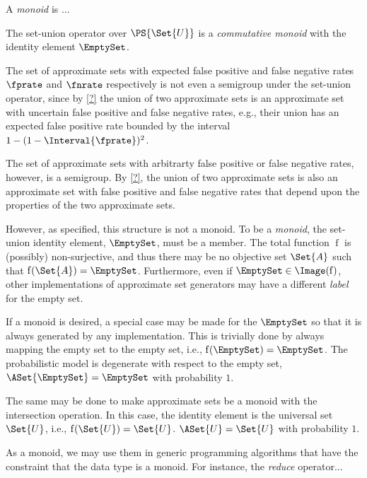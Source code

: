\documentclass[ ../main.tex]{subfiles}
\begin{document}
\begin{definition}
A \emph{monoid} is ...
\end{definition}

The set-union operator over $\PS{\Set{U}}$ is a \emph{commutative monoid} with the identity element $\EmptySet$.

The set of approximate sets with expected false positive and false negative rates $\fprate$ and $\fnrate$ respectively is not even a semigroup under the set-union operator, since by \cref{?} the union of two approximate sets is an approximate set with uncertain false positive and false negative rates, e.g., their union has an expected false positive rate bounded by the interval $1 - (1 - \Interval{\fprate})^2$.

The set of approximate sets with arbitrarty false positive or false negative rates, however, is a semigroup. By \cref{?}, the union of two approximate sets is also an approximate set with false positive and false negative rates that depend upon the properties of the two approximate sets.

However, as specified, this structure is not a monoid. To be a \emph{monoid}, the set-union identity element, $\EmptySet$, must be a member. The total function $\operatorname{f}$ is (possibly) non-surjective, and thus there may be no objective set $\Set{A}$ such that $\operatorname{f}(\Set{A}) = \EmptySet$. Furthermore, even if $\EmptySet \in \Image(\operatorname{f})$, other implementations of approximate set generators may have a different \emph{label} for the empty set.

If a monoid is desired, a special case may be made for the $\EmptySet$ so that it is always generated by any implementation. This is trivially done by always mapping the empty set to the empty set, i.e., $\operatorname{f}(\EmptySet) = \EmptySet$. The probabilistic model is degenerate with respect to the empty set, $\ASet{\EmptySet} = \EmptySet$ with probability $1$.

The same may be done to make approximate sets be a monoid with the intersection operation. In this case, the identity element is the universal set $\Set{U}$, i.e., $\operatorname{f}(\Set{U}) = \Set{U}$. $\ASet{U} = \Set{U}$ with probability $1$.

As a monoid, we may use them in generic programming algorithms that have the constraint that the data type is a monoid. For instance, the \emph{reduce} operator...
\end{document}
